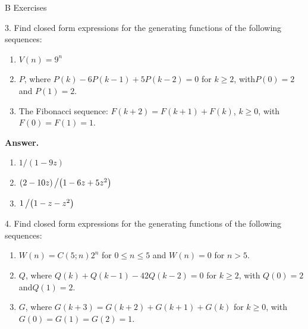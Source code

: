 \documentclass[10pt,]{book}
\theoremstyle{plain}
\theoremstyle{definition}
\theoremstyle{definition}
\theoremstyle{definition}
\theoremstyle{definition}
\numberwithin{equation}{section}
\begin{document}
\par\smallskip\noindent
\hypertarget{exercisegroup-11}{}\typeout{************************************************}
\typeout{************************************************}
B Exercises%
\begin{exercisegroup}
\item[3.]\hypertarget{exercise-39}{}Find closed form expressions for the generating functions of the following sequences:%
\par
\leavevmode%
\begin{enumerate}[label=\alph*]
\item\hypertarget{li-175}{}\(V(n) = 9^n\)%
\item\hypertarget{li-176}{}\(P\), where \(P(k) - 6 P(k - 1) + 5 P(k - 2) = 0\) for \(k \geq  2\), with\(P(0) = 2\)and \(P(1) = 2\).%
\item\hypertarget{li-177}{} The Fibonacci sequence: \(F(k + 2) = F(k + 1) + F(k)\), \(k \geq  0\), with \(F(0) = F(1) = 1\).%
\end{enumerate}
%
\par\smallskip
\par\smallskip
\noindent\textbf{Answer.}\hypertarget{answer-20}{}\quad
\leavevmode%
\begin{enumerate}[label=\alph*]
\item\hypertarget{li-178}{} \(1/(1-9z)\) %
\item\hypertarget{li-179}{} \((2-10z)\left/\left(1-6z+5z^2\right)\right.\)%
\item\hypertarget{li-180}{} \(1\left/\left(1-z-z^2\right)\right.\)%
\end{enumerate}
%
\item[4.]\hypertarget{exercise-40}{}Find closed form expressions for the generating functions of the following sequences:%
\par
\leavevmode%
\begin{enumerate}[label=\alph*]
\item\hypertarget{li-181}{} \(W(n) = C(5;n)2^n\) for \(0 \leq  n \leq  5\) and \(W(n) = 0\) for \(n > 5\).%
\item\hypertarget{li-182}{} \(Q\), where \(Q(k) + Q(k - 1) - 42Q(k - 2) = 0\) for \(k\geq 2\), with \(Q(0) = 2\) and\(Q(1) = 2\).%
\item\hypertarget{li-183}{} \(G\), where \(G(k + 3) = G(k + 2) + G(k + 1) + G(k)\) for \(k \geq  0\), with \(G(0) = G(1) = G(2) = 1\).%
\end{enumerate}
%
\par\smallskip

\end{exercisegroup}
\end{document}
